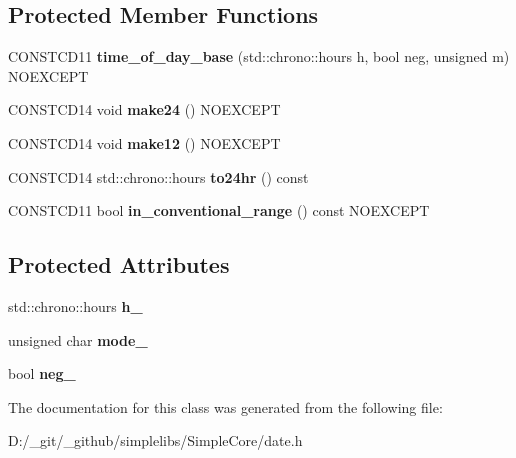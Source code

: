 \subsection*{Protected Member Functions}
\begin{DoxyCompactItemize}
\item 
\mbox{\label{classdate_1_1detail_1_1time__of__day__base_ac93402ed980599512227243bd9bc634f}} 
C\+O\+N\+S\+T\+C\+D11 {\bfseries time\+\_\+of\+\_\+day\+\_\+base} (std\+::chrono\+::hours h, bool neg, unsigned m) N\+O\+E\+X\+C\+E\+PT
\item 
\mbox{\label{classdate_1_1detail_1_1time__of__day__base_ab9b1b3509f4f2f154db8672b532c5d54}} 
C\+O\+N\+S\+T\+C\+D14 void {\bfseries make24} () N\+O\+E\+X\+C\+E\+PT
\item 
\mbox{\label{classdate_1_1detail_1_1time__of__day__base_a543c15a26b9b5d0894376bd1499fa74e}} 
C\+O\+N\+S\+T\+C\+D14 void {\bfseries make12} () N\+O\+E\+X\+C\+E\+PT
\item 
\mbox{\label{classdate_1_1detail_1_1time__of__day__base_a9471b2a4091b673cf8a5cc656d221ede}} 
C\+O\+N\+S\+T\+C\+D14 std\+::chrono\+::hours {\bfseries to24hr} () const
\item 
\mbox{\label{classdate_1_1detail_1_1time__of__day__base_a79c8fc9925a2451ee3951769b3730e02}} 
C\+O\+N\+S\+T\+C\+D11 bool {\bfseries in\+\_\+conventional\+\_\+range} () const N\+O\+E\+X\+C\+E\+PT
\end{DoxyCompactItemize}
\subsection*{Protected Attributes}
\begin{DoxyCompactItemize}
\item 
\mbox{\label{classdate_1_1detail_1_1time__of__day__base_a3f7973f5fe189833d0afaa4e1640b315}} 
std\+::chrono\+::hours {\bfseries h\+\_\+}
\item 
\mbox{\label{classdate_1_1detail_1_1time__of__day__base_a182ead7b323a818a756587e2b1b7393c}} 
unsigned char {\bfseries mode\+\_\+}
\item 
\mbox{\label{classdate_1_1detail_1_1time__of__day__base_a7ca30fb656cd24de968e6643751c2301}} 
bool {\bfseries neg\+\_\+}
\end{DoxyCompactItemize}


The documentation for this class was generated from the following file\+:\begin{DoxyCompactItemize}
\item 
D\+:/\+\_\+git/\+\_\+github/simplelibs/\+Simple\+Core/date.\+h\end{DoxyCompactItemize}
